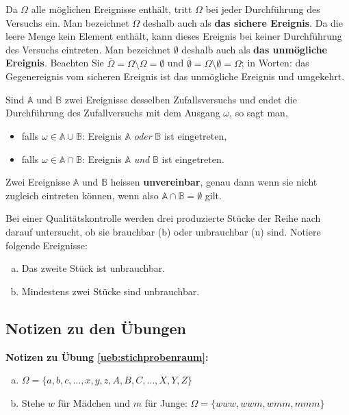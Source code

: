 \documentclass[%
11pt,%
twoside,%
titlepage,%
german,%
headsepline%
]{scrartcl}
\newcommand{\faEyeLightGray}{\textcolor{lightgray}{\faEye}} %
\newcommand{\concatueb}[1]{ueb:#1}%
\newcommand{\concatlsg}[1]{lsg:#1}%
\newenvironment{lsg}[1]{%
    \par\noindent\textbf{Notizen zu Übung \ref{\concatueb{#1}}:}%
    \label{\concatlsg{#1}}\par
}{%
    \par%
}
\newcommand{\uebh}[2]{%
  \begin{ueb}\label{\concatueb{#1}} %
    #2
    \hfill\hyperref[\concatlsg{#1}]{\faEyeLightGray}
  \end{ueb}%
}
\begin{document}
Da $\Omega$ alle möglichen Ereignisse enthält, tritt $\Omega$ bei jeder Durchführung des Versuchs ein. Man bezeichnet $\Omega$ deshalb auch als \textbf{das sichere Ereignis}. Da die leere Menge kein Element enthält, kann dieses Ereignis bei keiner Durchführung des Versuchs eintreten. Man bezeichnet $\emptyset$ deshalb auch als \textbf{das unmögliche Ereignis}. Beachten Sie $\overline{\Omega}=\Omega\setminus\Omega=\emptyset$ und  $\overline{\emptyset}=\Omega\setminus\emptyset=\Omega$; in Worten: das Gegenereignis vom sicheren Ereignis ist das unmögliche Ereignis und umgekehrt.

Sind $\mathbb{A}$ und $\mathbb{B}$ zwei Ereignisse desselben Zufallsversuchs und endet die Durchführung des Zufallversuchs mit dem Ausgang $\omega$, so sagt man,
\begin{itemize}
\item falls $\omega\in\mathbb{A}\cup\mathbb{B}$: \glqq Ereignis $\mathbb{A}$ \emph{oder} $\mathbb{B}$ ist eingetreten\grqq,
\item falls $\omega\in\mathbb{A}\cap\mathbb{B}$: \glqq Ereignis $\mathbb{A}$ \emph{und} $\mathbb{B}$ ist eingetreten\grqq.
\end{itemize}
Zwei Ereignisse $\mathbb{A}$ und $\mathbb{B}$ heissen \textbf{unvereinbar}, genau dann wenn sie nicht zugleich eintreten können, wenn also $\mathbb{A}\cap\mathbb{B}=\emptyset$ gilt.

\uebh{ereignisse}{
Bei einer Qualitätskontrolle werden drei produzierte Stücke der Reihe nach darauf untersucht, ob sie brauchbar (b) oder unbrauchbar (u) sind. Notiere folgende Ereignisse:
\begin{enumerate}[a)]
\item Das zweite Stück ist unbrauchbar.
\item Mindestens zwei Stücke sind unbrauchbar.
\end{enumerate}
}

\clearpage

\subsection{Notizen zu den \"Ubungen}

\begin{lsg}{stichprobenraum}
	\begin{enumerate}[a)]
	\item $\Omega=\{a,b,c,\dots,x,y,z,A,B,C,\dots,X,Y,Z\}$
	\item Stehe $w$ f\"ur M\"adchen und $m$ f\"ur Junge: $\Omega=\{www,wwm,wmm,mmm\}$
	\end{enumerate}
\end{lsg}
\end{document}
